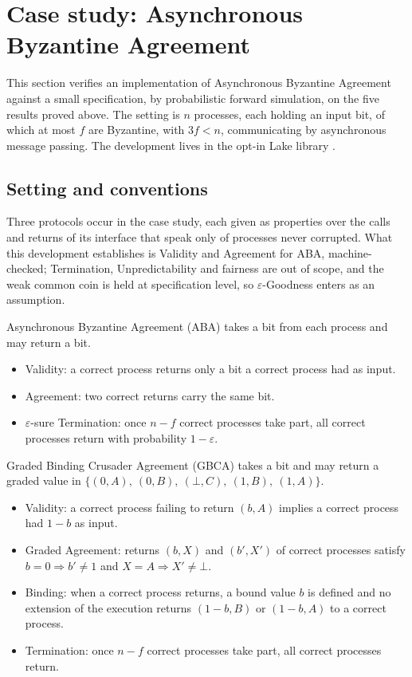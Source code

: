 \section{Case study: Asynchronous Byzantine Agreement}

This section verifies an implementation of Asynchronous Byzantine Agreement against a small specification, by probabilistic forward simulation, on the five results proved above.
The setting is $n$ processes, each holding an input bit, of which at most $f$ are Byzantine, with $3f < n$, communicating by asynchronous message passing.
The development lives in the opt-in Lake library .

\subsection{Setting and conventions}

Three protocols occur in the case study, each given as properties over the calls and returns of its interface that speak only of processes never corrupted.
What this development establishes is Validity and Agreement for ABA, machine-checked; Termination, Unpredictability and fairness are out of scope, and the weak common coin is held at specification level, so $\varepsilon$-Goodness enters as an assumption.

Asynchronous Byzantine Agreement (ABA) takes a bit from each process and may return a bit.
\begin{itemize}
  \item Validity: a correct process returns only a bit a correct process had as input.
  \item Agreement: two correct returns carry the same bit.
  \item $\varepsilon$-sure Termination: once $n-f$ correct processes take part, all correct processes return with probability $1-\varepsilon$.
\end{itemize}

Graded Binding Crusader Agreement (GBCA) takes a bit and may return a graded value in $\{(0,A),\ (0,B),\ (\bot,C),\ (1,B),\ (1,A)\}$.
\begin{itemize}
  \item Validity: a correct process failing to return $(b,A)$ implies a correct process had $1-b$ as input.
  \item Graded Agreement: returns $(b,X)$ and $(b',X')$ of correct processes satisfy $b = 0 \Rightarrow b' \neq 1$ and $X = A \Rightarrow X' \neq \bot$.
  \item Binding: when a correct process returns, a bound value $b$ is defined and no extension of the execution returns $(1-b,B)$ or $(1-b,A)$ to a correct process.
  \item Termination: once $n-f$ correct processes take part, all correct processes return.
\end{itemize}

